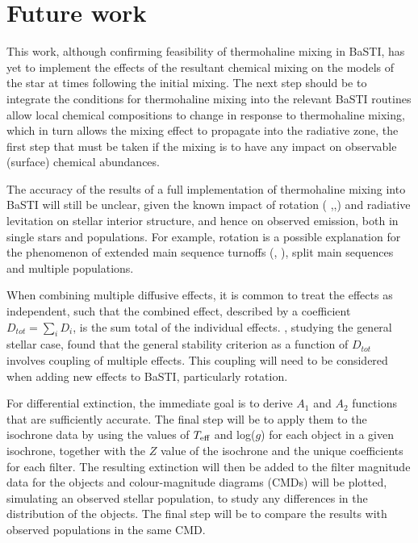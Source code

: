 \documentclass[12pt, a4paper]{report}
\begin{document}
\chapter{Future work}
This work, although confirming feasibility of thermohaline mixing in BaSTI, has yet to implement the effects of the resultant chemical mixing on the models of the star at times following the initial mixing. The next step should be to integrate the conditions for thermohaline mixing into the relevant BaSTI routines allow local chemical compositions to change in response to thermohaline mixing, which in turn allows the mixing effect to propagate into the radiative zone, the first step that must be taken if the mixing is to have any impact on observable (surface) chemical abundances.

The accuracy of the results of a full implementation of thermohaline mixing into BaSTI will still be unclear, given the known impact of rotation (\cite{1963ApJ...138.1134C} \cite{1998A&A...334.1000M},\cite{2017A&A...606A..55M},\cite{2012A&A...537A.146E}) and radiative levitation \citep{2016A&A...592A..29M} on stellar interior structure, and hence on observed emission, both in single stars  and populations. For example, rotation is a possible explanation for the phenomenon of extended main sequence turnoffs (\cite{2015MNRAS.453.2070N}, \cite{2016MNRAS.460L..20B}), split main sequences and multiple populations.

When combining multiple diffusive effects, it is common to treat the effects as independent, such that the combined effect, described by a coefficient $D_{tot} = \sum_{i} D_{i}$, is the sum total of the individual effects. \cite{2013A&A...553A...1M}, studying the general stellar case, found that the general stability criterion as a function of $D_{tot}$ involves coupling of multiple effects. This coupling will need to be considered when adding new effects to BaSTI, particularly rotation.

For differential extinction, the immediate goal is to derive $A_{1}$ and $A_{2}$ functions that are  sufficiently accurate. The final step will be to apply them to the isochrone data by using the values of $T_{\textnormal{eff}}$ and log($g$) for each object in a given isochrone, together with the $Z$ value of the isochrone and the unique coefficients for each filter. The resulting extinction will then be added to the filter magnitude data for the objects and colour-magnitude diagrams (CMDs) will be plotted, simulating an observed stellar population, to study any differences in the distribution of the objects. The final step will be to compare the results with observed populations in the same CMD.
\end{document}
